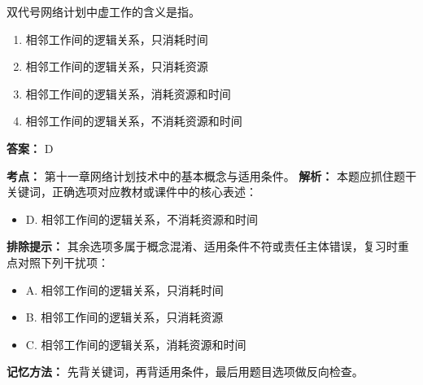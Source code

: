 \documentclass[UTF8,fontset=fandol,11pt]{ctexart}
\begin{document}
\begin{quizbox}[title={第 1 题}]
双代号网络计划中虚工作的含义是指。\\
\begin{enumerate}[label=\Alph*.]
\item 相邻工作间的逻辑关系，只消耗时间
\item 相邻工作间的逻辑关系，只消耗资源
\item 相邻工作间的逻辑关系，消耗资源和时间
\item 相邻工作间的逻辑关系，不消耗资源和时间
\end{enumerate}
\textbf{答案：} D
\vspace{0.25em}
\begin{answerbox}[title={考点解析}]
\textbf{考点：} 第十一章网络计划技术中的基本概念与适用条件。
\textbf{解析：} 本题应抓住题干关键词，正确选项对应教材或课件中的核心表述：
\begin{itemize}
\item D. 相邻工作间的逻辑关系，不消耗资源和时间
\end{itemize}
\textbf{排除提示：} 其余选项多属于概念混淆、适用条件不符或责任主体错误，复习时重点对照下列干扰项：
\begin{itemize}
\item A. 相邻工作间的逻辑关系，只消耗时间
\item B. 相邻工作间的逻辑关系，只消耗资源
\item C. 相邻工作间的逻辑关系，消耗资源和时间
\end{itemize}
\textbf{记忆方法：} 先背关键词，再背适用条件，最后用题目选项做反向检查。
\end{answerbox}
\end{quizbox}
\end{document}
